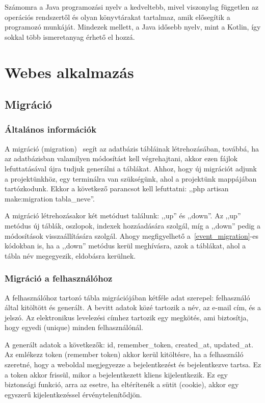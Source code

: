 \documentclass[
]{thesis-ekf}
\theoremstyle{definition}
\theoremstyle{remark}
\begin{document}
	Számomra a Java programozási nyelv a kedveltebb, mivel viszonylag független az operációs rendszertől és olyan könyvtárakat tartalmaz, amik elősegítik a programozó munkáját. Mindezek mellett, a Java idősebb nyelv, mint a Kotlin, így sokkal több ismeretanyag érhető el hozzá.
	
	\chapter{Webes alkalmazás}
	\section{Migráció}
	\subsection{Általános információk}
	A migráció (migration)~\cite{laravel_migartion} segít az adatbázis tábláinak létrehozásában, továbbá, ha az adatbázisban valamilyen módosítást kell végrehajtani, akkor ezen fájlok lefuttatásával újra tudjuk generálni a táblákat. Ahhoz, hogy új migrációt adjunk a projektünkhöz, egy terminálra van szükségünk, ahol a projektünk mappájában tartózkodunk. Ekkor a következő parancsot kell lefuttatni: ,,php artisan make:migration tabla\_neve''.
	
	A migráció létrehozásakor két metódust találunk: ,,up'' és ,,down''. Az ,,up'' metódus új táblák, oszlopok, indexek hozzáadására szolgál, míg a ,,down'' pedig a módosítások visszaállítására szolgál. Ahogy megfigyelhető a~\ref{event_migration}-es kódokban is, ha a ,,down'' metódus kerül meghívásra, azok a táblákat, ahol a tábla név megegyezik, eldobásra kerülnek.
	
	\subsection{Migráció a felhasználóhoz}
	A felhasználóhoz tartozó tábla migrációjában kétféle adat szerepel: felhasználó által kitöltött és generált. A bevitt adatok közé tartozik a név, az e-mail cím, és a jelszó. Az elektronikus levelezési címhez tartozik egy megkötés, ami biztosítja, hogy egyedi (unique) minden felhasználónál. 
	
	A generált adatok a következők: id, remember\_token, created\_at, updated\_at. Az emlékezz token (remember token) akkor kerül kitöltésre, ha a felhasználó szeretné, hogy a weboldal megjegyezze a bejelentkezést és bejelentkezve tartsa. Ez a token akkor frissül, mikor a bejelentkezett kliens kijelentkezik. Ez egy biztonsági funkció, arra az esetre, ha eltérítenék a sütit (cookie), akkor egy egyszerű kijelentkezéssel érvénytelenítődjön. 
	
\end{document}
